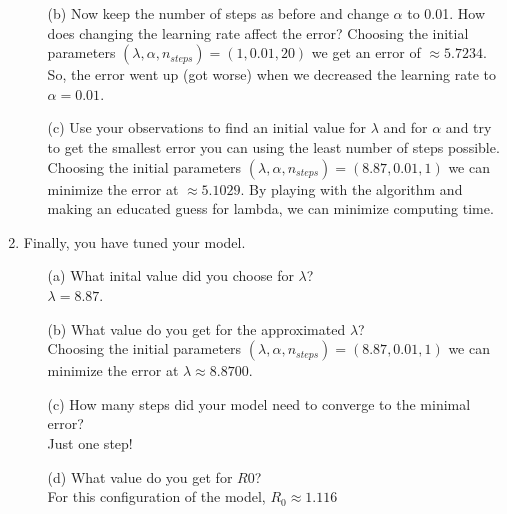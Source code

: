 \documentclass[11pt]{article}
\begin{document}
\begin{enumerate}
\begin{enumerate}
\item[(b)] Now keep the number of steps as before  and change $\alpha$ to 0.01. How does changing the learning rate affect the error?
{\color{blue}
    Choosing the initial parameters $(\lambda , \alpha , n_{steps}) = (1,0.01,20)$ we get an error of $\approx 5.7234$. So, the error went up (got worse) when we decreased the learning rate to $\alpha = 0.01$.
    }
\vspace{4cm}

\item[(c)] Use your observations to find an initial value for $\lambda$ and for $\alpha$ and try to get the smallest error you can using the least number of steps possible.
{\color{blue}
    Choosing the initial parameters $(\lambda , \alpha , n_{steps}) = (8.87,0.01,1)$ we can minimize the error at $\approx 5.1029$. By playing with the algorithm and making an educated guess for lambda, we can minimize computing time.
    }
\vspace{4cm}



\end{enumerate}
\vspace{4cm}




\item Finally, you have tuned your model.
    \begin{enumerate}
    \item[(a)] What inital value did you choose for  $\lambda$? \\
    {\color{blue}
    $\lambda = 8.87$. 
    }
    \vspace{3cm}
    
    \item[(b)] What value do you get for the approximated $\lambda$?\\ 
    {\color{blue}
    Choosing the initial parameters $(\lambda , \alpha , n_{steps}) = (8.87,0.01,1)$ we can minimize the error at $\lambda \approx 8.8700$. 
    }
    \vspace{3cm}
    
    \item[(c)] How many steps did your model need to converge to the minimal error?\\
    {\color{blue} Just one step!}
    \vspace{3cm}
    
    \item[(d)] What value do you get for $R0$? \\
    {\color{blue} For this configuration of the model, $R_0 \approx 1.116$}
    \vspace{3cm}
    

\end{enumerate}
\end{enumerate}
\end{document}
